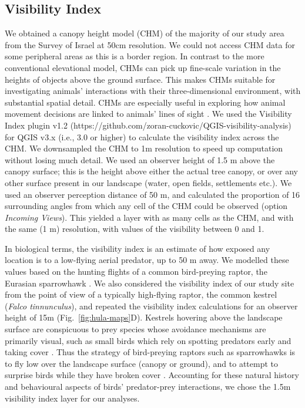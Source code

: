 \subsection*{Visibility Index}

We obtained a canopy height model (CHM) of the majority of our study area from the Survey of Israel at 50cm resolution.
We could not access CHM data for some peripheral areas as this is a border region.
In contrast to the more conventional elevational model, CHMs can pick up fine-scale variation in the heights of objects above the ground surface.
This makes CHMs suitable for investigating animals' interactions with their three-dimensional environment, with substantial spatial detail.
CHMs are especially useful in exploring how animal movement decisions are linked to animals' lines of sight \parencite{aben2018,aben2021}.
We used the Visibility Index plugin v1.2 (https://github.com/zoran-cuckovic/QGIS-visibility-analysis) for QGIS v3.x (i.e., 3.0 or higher) to calculate the visibility index across the CHM.
We downsampled the CHM to 1m resolution to speed up computation without losing much detail.
We used an observer height of 1.5 m above the canopy surface; this is the height above either the actual tree canopy, or over any other surface present in our landscape (water, open fields, settlements etc.).
We used an observer perception distance of 50 m, and calculated the proportion of 16 surrounding angles from which any cell of the CHM could be observed (option \textit{Incoming Views}).
This yielded a layer with as many cells as the CHM, and with the same (1 m) resolution, with values of the visibility between 0 and 1.

In biological terms, the visibility index is an estimate of how exposed any location is to a low-flying aerial predator, up to 50 m away.
We modelled these values based on the hunting flights of a common bird-preying raptor, the Eurasian sparrowhawk \parencite[\textit{Accipiter nisus}][]{seress2011,krams2001,krams2020}.
We also considered the visibility index of our study site from the point of view of a typically high-flying raptor, the common kestrel (\textit{Falco tinnunculus}), and repeated the visibility index calculations for an observer height of 15m (Fig.~\ref{fig:hula-maps}D).
Kestrels hovering above the landscape surface are conspicuous to prey species whose avoidance mechanisms are primarily visual, such as small birds which rely on spotting predators early and taking cover \parencite{krams2001,krams2020}.
Thus the strategy of bird-preying raptors such as sparrowhawks is to fly low over the landscape surface (canopy or ground), and to attempt to surprise birds while they have broken cover \parencite{krams2001,seress2011,krams2020}.
Accounting for these natural history and behavioural aspects of birds' predator-prey interactions, we chose the 1.5m visibility index layer for our analyses.

